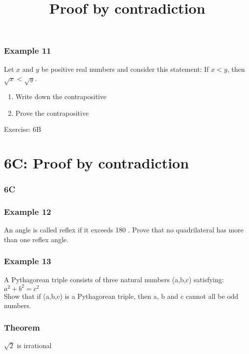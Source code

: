 \documentclass{beamer}
\begin{document}
\begin{frame}[t]
    \frametitle{Example 11}
    Let $x$ and $y$ be positive real numbers and consider this statement: If $x < y$, then $\sqrt{x} <\sqrt{y}$.\\
    \begin{enumerate}
        \item Write down the contrapositive
        \item Prove the contrapositive
    \end{enumerate}
\end{frame}

\begin{frame}{Exercise: 6B}
\end{frame}

\section{6C: Proof by contradiction}
\begin{frame}
    \frametitle{6C}
    \begin{center}
        \title{Proof by contradiction}
        \maketitle
    \end{center}
\end{frame}

\begin{frame}[t]
    \frametitle{Example 12}
    An angle is called reflex if it exceeds 180 . Prove that no quadrilateral has more than one
    reflex angle.

\end{frame}

\begin{frame}[t]
    \frametitle{Example 13}
    A Pythagorean triple consists of three natural numbers (a,b,c) satisfying:\\
    $a^2 + b^2 = c^2$\\
    Show that if (a,b,c) is a Pythagorean triple, then a, b and c cannot all be odd numbers.
\end{frame}

\begin{frame}[t]
    \frametitle{Theorem}
    $\sqrt{2}$ is irrational
\end{frame}
\begin{frame}
\end{frame}
\end{document}
